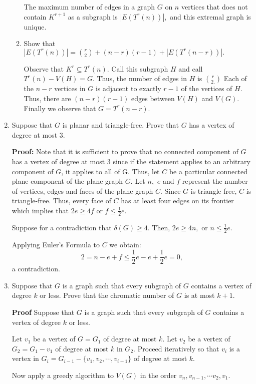 \documentclass[12pt]{article}
\begin{document}
\begin{enumerate}
\begin{enumerate}
The maximum number of edges in a graph $G$ on $n$ vertices that does not contain $K^{r+1}$ as a subgraph is $|E(T^r(n))|,$ and this extremal graph is unique.\\

	
	\item Show that $|E(T^r(n))|={ r \choose 2}+(n-r)(r-1) +|E(T^r(n-r))|.$
	
	Observe that $K^r \subseteq T^r(n).$ Call this subgraph $H$ and call $T^r(n)-V(H)=G.$ Thus, the number of edges in $H$ is $r \choose 2.$ Each of the $n-r$ vertices in $G$ is adjacent to exactly $r-1$ of the vertices of $H$. Thus, there are $(n-r)(r-1)$ edges between $V(H)$ and $V(G).$  Finally we observe that $G=T^r(n-r).$
	
	\end{enumerate}
\item Suppose that $G$ is planar and triangle-free. Prove that $G$ has a vertex of degree at most 3.

\textbf{Proof:} Note that it is sufficient to prove that no connected component of $G$ has a vertex of degree at most 3 since if the statement applies to an arbitrary component of $G$, it applies to all of G.  Thus, let $C$ be a particular connected plane component of the plane graph $G$.  Let $n,$ $e$ and $f$ represent the number of vertices, edges and faces of the plane graph $C.$ Since $G$ is triangle-free, $C$ is triangle-free. Thus, every face of $C$ has at least four edges on its frontier which implies that $2e\geq 4f$ or $f\leq \frac{1}{2}e.$ 

Suppose for a contradiction that $\delta(G)\geq 4.$ Then, $2e \geq 4n,$ or $n \leq \frac{1}{2}e.$

Applying Euler's Formula to $C$ we obtain:
$$2=n-e+f\leq \frac{1}{2}e-e+\frac{1}{2}e=0,$$ a contradiction.

\item Suppose that $G$ is a graph such that every subgraph of $G$ contains a vertex of degree $k$ or less. Prove that the chromatic number of $G$ is at most $k+1.$

\textbf{Proof} Suppose that $G$ is a graph such that every subgraph of $G$ contains a vertex of degree $k$ or less.

Let $v_1$ be a vertex of $G=G_1$ of degree at most $k$. Let $v_2$ be a vertex of $G_2=G_1-v_1$ of degree at most $k$ in $G_2.$ Proceed iteratively so that $v_i$ is a vertex in $G_i=G_{i-1}-\{v_1,v_2,\cdots,v_{i-1}\}$ of degree at most $k.$ 

Now apply a greedy algorithm to $V(G)$ in the order $v_n, v_{n-1}, \cdots v_2, v_1.$ 

\vfill
\end{enumerate}
\end{document}
